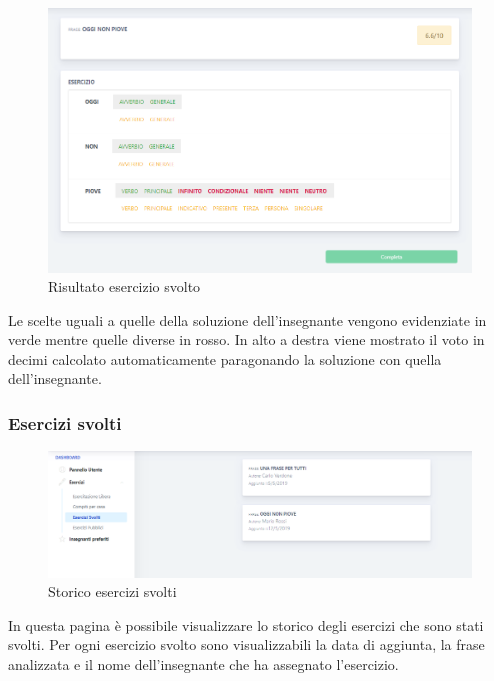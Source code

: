 	\begin{figure}[H]
            	\centering
            	\includegraphics[width=17cm]{sez/img/studente/risultatoEsercizio.png} 
            	\caption{Risultato esercizio svolto}\label{fig:1}
        	\end{figure}     
        Le scelte uguali a quelle della soluzione dell'insegnante vengono evidenziate in verde mentre quelle diverse in rosso. In alto a destra viene mostrato il voto in decimi calcolato automaticamente paragonando la soluzione con quella dell'insegnante.
        
        \subsubsection{Esercizi svolti}
        	\begin{figure}[H]
            	\centering
            	\includegraphics[width=17cm]{sez/img/studente/esercizisvolti.PNG} 
            	\caption{Storico esercizi svolti}\label{fig:1}
        	\end{figure}
          In questa pagina è possibile visualizzare lo storico degli esercizi che sono stati svolti. Per ogni esercizio svolto sono visualizzabili la data di aggiunta, la frase analizzata e il nome dell'insegnante che ha assegnato l'esercizio.
          
          
